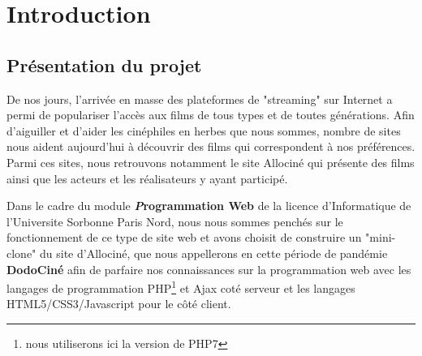 \chapter*{Introduction}
        
    \section*{Présentation du projet}

        De nos jours, l'arrivée en masse des plateformes de "streaming" sur Internet a permi de populariser l'accès aux films de tous types et de toutes générations. Afin d'aiguiller et d'aider les cinéphiles en herbes que nous sommes, nombre de sites nous aident aujourd'hui à découvrir des films qui correspondent à nos préférences. Parmi ces sites, nous retrouvons notamment le site Allociné qui présente des films ainsi que les acteurs et les réalisateurs y ayant participé.

        \medskip
        Dans le cadre du module {\bfseries \textit Programmation Web} de la licence d'Informatique de l'Universite Sorbonne Paris Nord, nous nous sommes penchés sur le fonctionnement de ce type de site web et avons choisit de construire un "mini-clone" du site d'Allociné, que nous appellerons en cette période de pandémie {\bfseries DodoCiné} afin de parfaire nos connaissances sur la programmation web avec les langages de programmation PHP\footnote{nous utiliserons ici la version de PHP7} et Ajax coté serveur et les langages HTML5/CSS3/Javascript pour le côté client.
    
        \vfill


        \vfill

